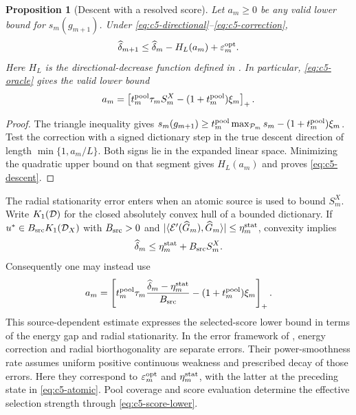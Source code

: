 \documentclass[11pt]{article}
\newtheorem{proposition}[theorem]{Proposition}
\theoremstyle{remark}
\begin{document}
\begin{proposition}[Descent with a resolved score]
\label{prop:c5-descent}
Let $a_m\geq0$ be any valid lower bound for $s_m(g_{m+1})$.
Under \eqref{eq:c5-directional}--\eqref{eq:c5-correction},
\begin{equation}
 \widehat\delta_{m+1}\leq\widehat\delta_m-H_L(a_m)
                       +\varepsilon_m^{\rm opt}.
 \label{eq:c5-descent}
\end{equation}
Here $H_L$ is the directional-decrease function defined in \CGAHLDreference.
In particular, \eqref{eq:c5-oracle} gives the valid lower bound
\begin{equation}
 a_m=\left[t_m^{\rm pool}\tau_m S_m^X
                 -(1+t_m^{\rm pool})\xi_m\right]_+ .
 \label{eq:c5-score-lower}
\end{equation}
\end{proposition}
\begin{proof}
The triangle inequality gives
$s_m(g_{m+1})\geq
t_m^{\rm pool}\max_{\mathcal P_m}s_m-(1+t_m^{\rm pool})\xi_m$.
Test the correction with a signed dictionary step in the true descent
direction of length $\min\{1,a_m/L\}$. Both signs lie in the expanded
linear space. Minimizing the quadratic upper bound on that segment
gives $H_L(a_m)$ and proves \eqref{eq:c5-descent}.
\end{proof}

The radial stationarity error enters when an atomic source is used to
bound $S_m^X$. Write $K_1(\mathcal D)$ for the closed absolutely convex hull
of a bounded dictionary. If
$u^*\in B_{\rm src}K_1(\mathcal D_X)$ with $B_{\rm src}>0$ and
$|\langle\mathcal E'(\widehat G_m),\widehat G_m\rangle|
\leq\eta_m^{\rm stat}$, convexity implies
\begin{equation}
 \widehat\delta_m\leq\eta_m^{\rm stat}+B_{\rm src}S_m^X .
 \label{eq:c5-atomic}
\end{equation}
Consequently one may instead use
\[
 a_m=\left[
 t_m^{\rm pool}\tau_m
       \frac{\widehat\delta_m-\eta_m^{\rm stat}}{B_{\rm src}}
 -(1+t_m^{\rm pool})\xi_m\right]_+ .
\]
This source-dependent estimate expresses the selected-score lower bound in terms of the energy gap and radial stationarity.
In the error framework of \cite[Section~3, Theorem~3.2 and
Lemma~6.3]{DereventsovTemlyakov2022}, energy correction and radial
biorthogonality are separate errors. Their power-smoothness rate assumes
uniform positive continuous weakness and prescribed decay of those errors.
Here they correspond to $\varepsilon_m^{\rm opt}$ and
$\eta_m^{\rm stat}$, with the latter at the preceding state in
\eqref{eq:c5-atomic}. Pool coverage and score evaluation determine the effective selection strength through \eqref{eq:c5-score-lower}.
\end{document}
